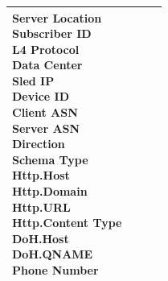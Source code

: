 \begin{description}
\begin{longtable}{p{}|p{}|p{}|p{}}
{                                                                                                            Server Location\\
                                                                                                            Subscriber ID\\
                                                                                                            L4 Protocol\\
                                                                                                            Data Center\\
                                                                                                            Sled IP\\
                                                                                                            Device ID\\
                                                                                                            Client ASN\\
                                                                                                            Server ASN\\
                                                                                                            Direction\\
                                                                                                            Schema Type\\
                                                                                                            Http.Host\\
                                                                                                            Http.Domain\\
                                                                                                            Http.URL\\
                                                                                                            Http.Content Type\\
                                                                                                            DoH.Host\\
                                                                                                            DoH.QNAME\\
                                                                                                            Phone Number}   \\ \hline   

\end{longtable}
\end{description}

